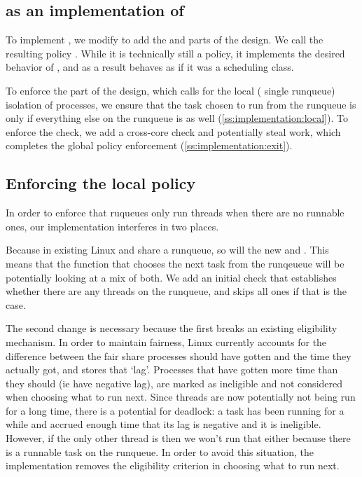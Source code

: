 \subsection{\schedbe{} as an implementation of \beclass{}}

To implement \beclass{}, we modify \schedidle{} to add the \local{} and \exit{}
parts of the \beclass{} design. We call the resulting policy \schedbe{}. While
it is technically still a policy, it implements the desired behavior of
\beclass{}, and as a result behaves as if it was a scheduling class.

To enforce the \local{} part of the design, which calls for the local (\ie{}
single runqueue) isolation of \schedbe{} processes, we ensure that the task
chosen to run from the runqueue is only \schedbe{} if everything else on the
runqueue is as well (\autoref{ss:implementation:local}). To enforce the \exit{}
check, we add a cross-core check and potentially steal work, which completes the
global policy enforcement (\autoref{ss:implementation:exit}).

\subsection{Enforcing the local policy}\label{ss:implementation:local}

In order to enforce that ruqueues only run \schedbe{} threads when there are no
runnable \schednormal{} ones, our implementation interferes in two places. 

Because in existing Linux \schedidle{} and \schednormal{} share a runqueue, so
will the new \schedbe{} and \schednormal{}. This means that the function that
chooses the next task from the runqeueue will be potentially looking at a mix of
both. We add an initial check that establishes whether there are any
\schednormal{} threads on the runqueue, and skips all \schedbe{} ones if that is
the case. 

The second change is necessary because the first breaks an existing eligibility
mechanism. In order to maintain fairness, Linux currently accounts for the
difference between the fair share processes should have gotten and the time they
actually got, and stores that `lag'. Processes that have gotten more time than
they should (ie have negative lag), are marked as ineligible and not considered
when choosing what to run next. Since \schedbe{} threads are now potentially not
being run for a long time, there is a potential for deadlock: a \schednormal{}
task has been running for a while and accrued enough time that its lag is
negative and it is ineligible. However, if the only other thread is \schedbe{}
then we won't run that either because there is a runnable \schednormal{} task on
the runqueue. In order to avoid this situation, the implementation removes the
eligibility criterion in choosing what to run next.


